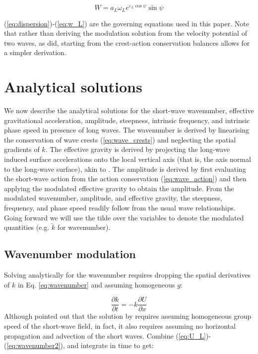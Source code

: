 \documentclass[lineno]{jfm}
\begin{document}
\begin{equation}
\label{eq:w_L}
W = a_L \omega_L e^{\varepsilon_L \cos{\psi}} \sin{\psi}
\end{equation}

(\ref{eq:dispersion})-(\ref{eq:w_L}) are the governing equations used in this paper.
Note that rather than deriving the modulation solution from the velocity
potential of two waves, as \citet{longuet1960changes} did, starting from the
crest-action conservation balances allows for a simpler derivation.

\section{Analytical solutions}
\label{section:analytical_solutions}

We now describe the analytical solutions for the short-wave wavenumber,
effective gravitational acceleration, amplitude, steepness, intrinsic frequency,
and intrinsic phase speed in presence of long waves.
The wavenumber is derived by linearising the conservation of wave crests
(\ref{eq:wave_crests}) and neglecting the spatial gradients of $k$.
The effective gravity is derived by projecting the long-wave induced surface
accelerations onto the local vertical axis (that is, the axis normal to the
long-wave surface), akin to \citet{zhang1990evolution}.
The amplitude is derived by first evaluating the short-wave action from the
action conservation (\ref{eq:wave_action}) and then applying the modulated
effective gravity to obtain the amplitude.
From the modulated wavenumber, amplitude, and effective gravity, the steepness,
frequency, and phase speed readily follow from the usual wave relationships.
Going forward we will use the tilde over the variables to denote the modulated
quantities (e.g. $\widetilde{k}$ for wavenumber).

\subsection{Wavenumber modulation}
\label{subsection:wavenumber_modulation}

Solving analytically for the wavenumber requires dropping the spatial derivatives
of $k$ in Eq. \ref{eq:wavenumber} and assuming homogeneous $g$:

\begin{equation}
\label{eq:wavenumber2}
\dfrac{\partial k}{\partial t}
= - k \dfrac{\partial U}{\partial x}
\end{equation}
Although \citet{peureux2021unsteady} pointed out that the solution by
\citet{longuet1960changes} requires assuming homogeneous group speed of the
short-wave field, in fact, it also requires assuming no horizontal propagation
and advection of the short waves.
Combine (\ref{eq:U_L})-(\ref{eq:wavenumber2}), and integrate in time to get:
\end{document}
